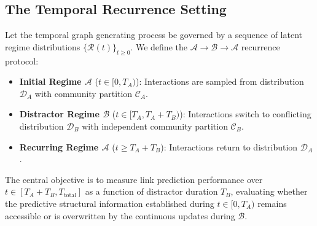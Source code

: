 \subsection{The Temporal Recurrence Setting}
Let the temporal graph generating process be governed by a sequence of latent regime distributions $\{\mathcal{R}(t)\}_{t \ge 0}$. We define the $\mathcal{A} \to \mathcal{B} \to \mathcal{A}$ recurrence protocol:
\begin{itemize}
    \item \textbf{Initial Regime $\mathcal{A}$} ($t \in [0, T_A)$): Interactions are sampled from distribution $\mathcal{D}_A$ with community partition $\mathcal{C}_A$.
    \item \textbf{Distractor Regime $\mathcal{B}$} ($t \in [T_A, T_A + T_B)$): Interactions switch to conflicting distribution $\mathcal{D}_B$ with independent community partition $\mathcal{C}_B$.
    \item \textbf{Recurring Regime $\mathcal{A}$} ($t \ge T_A + T_B$): Interactions return to distribution $\mathcal{D}_A$.
\end{itemize}

The central objective is to measure link prediction performance over $t \in [T_A + T_B, T_{\text{total}}]$ as a function of distractor duration $T_B$, evaluating whether the predictive structural information established during $t \in [0, T_A)$ remains accessible or is overwritten by the continuous updates during $\mathcal{B}$.
